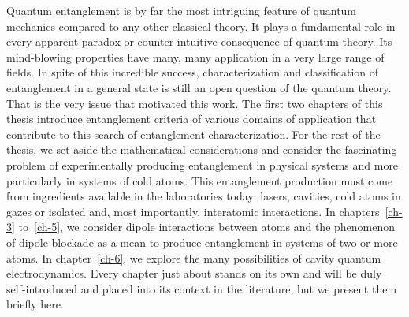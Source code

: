Quantum entanglement is by far the most intriguing feature of quantum mechanics compared to any other classical theory. It plays a fundamental role in every apparent paradox or counter-intuitive consequence of quantum theory. Its mind-blowing properties have many, many application in a very large range of fields. In spite of this incredible success, characterization and classification of entanglement in a general state is still an open question of the quantum theory. That is the very issue that motivated this work. The first two chapters of this thesis introduce entanglement criteria of various domains of application that contribute to this search of entanglement characterization. For the rest of the thesis, we set aside the mathematical considerations and consider the fascinating problem of experimentally producing entanglement in physical systems and more particularly in systems of cold atoms.  This entanglement production must come from ingredients  available in the laboratories today: lasers, cavities, cold atoms in gazes or isolated and, most importantly, interatomic interactions. In chapters~\ref{ch-3} to~\ref{ch-5}, we consider dipole interactions between atoms and the phenomenon of dipole blockade as a mean to produce entanglement in systems of two or more atoms. In chapter~\ref{ch-6}, we explore the many possibilities of cavity quantum electrodynamics.  Every chapter just about stands on its own and will be duly self-introduced and placed into its context in the literature, but we present them briefly here.

